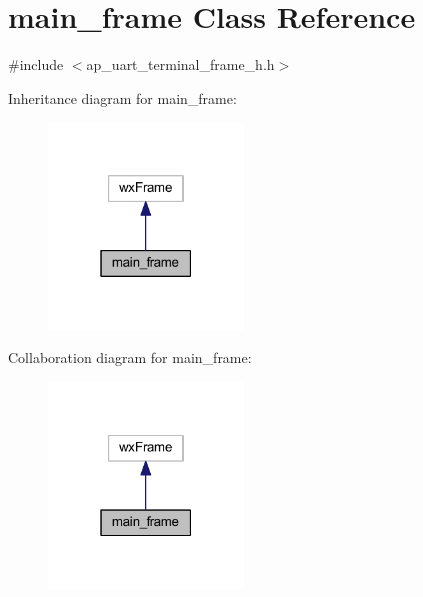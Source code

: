 \section{main\+\_\+frame Class Reference}
\label{classmain__frame}


{\ttfamily \#include $<$ap\+\_\+uart\+\_\+terminal\+\_\+frame\+\_\+h.\+h$>$}



Inheritance diagram for main\+\_\+frame\+:\nopagebreak
\begin{figure}[H]
\begin{center}
\leavevmode
\includegraphics[width=147pt]{classmain__frame__inherit__graph}
\end{center}
\end{figure}


Collaboration diagram for main\+\_\+frame\+:\nopagebreak
\begin{figure}[H]
\begin{center}
\leavevmode
\includegraphics[width=147pt]{classmain__frame__coll__graph}
\end{center}
\end{figure}

